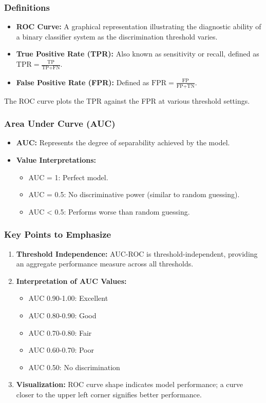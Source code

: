\documentclass[aspectratio=169]{beamer}
\begin{document}
\begin{frame}
    \frametitle{Definitions}
    \begin{itemize}
        \item \textbf{ROC Curve:} A graphical representation illustrating the diagnostic ability of a binary classifier system as the discrimination threshold varies.
        \item \textbf{True Positive Rate (TPR):} Also known as sensitivity or recall, defined as \( \text{TPR} = \frac{\text{TP}}{\text{TP} + \text{FN}} \).
        \item \textbf{False Positive Rate (FPR):} Defined as \( \text{FPR} = \frac{\text{FP}}{\text{FP} + \text{TN}} \).
    \end{itemize}
    
    The ROC curve plots the TPR against the FPR at various threshold settings.
\end{frame}

\begin{frame}
    \frametitle{Area Under Curve (AUC)}
    \begin{itemize}
        \item \textbf{AUC:} Represents the degree of separability achieved by the model.
        \item \textbf{Value Interpretations:}
            \begin{itemize}
                \item AUC = 1: Perfect model.
                \item AUC = 0.5: No discriminative power (similar to random guessing).
                \item AUC < 0.5: Performs worse than random guessing.
            \end{itemize}
    \end{itemize}
\end{frame}

\begin{frame}
    \frametitle{Key Points to Emphasize}
    \begin{enumerate}
        \item \textbf{Threshold Independence:} AUC-ROC is threshold-independent, providing an aggregate performance measure across all thresholds.
        \item \textbf{Interpretation of AUC Values:}
            \begin{itemize}
                \item AUC 0.90-1.00: Excellent
                \item AUC 0.80-0.90: Good
                \item AUC 0.70-0.80: Fair
                \item AUC 0.60-0.70: Poor
                \item AUC 0.50: No discrimination
            \end{itemize}
        \item \textbf{Visualization:} ROC curve shape indicates model performance; a curve closer to the upper left corner signifies better performance.
    \end{enumerate}
\end{frame}
\end{document}
